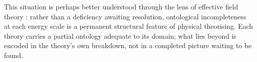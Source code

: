 \medskip

This situation is perhaps better understood through the lens of effective field theory \cite{weinberg_1979_eft}: rather than a deficiency awaiting resolution, ontological incompleteness at each energy scale is a permanent structural feature of physical theorising. Each theory carries a partial ontology adequate to its domain; what lies beyond is encoded in the theory's own breakdown, not in a completed picture waiting to be found.

\medskip

